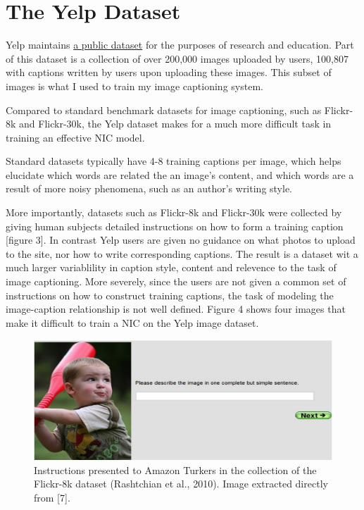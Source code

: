 \documentclass[letterpaper, 10 pt, conference]{ieeeconf}
\begin{document}
\section{The Yelp Dataset}

Yelp maintains \href{https://www.yelp.com/dataset}{a public dataset} for the purposes of research and education. Part of this dataset is a collection of over 200,000 images uploaded by users, 100,807 with captions written by users upon uploading these images. This subset of images is what I used to train my image captioning system. 

Compared to standard benchmark datasets for image captioning, such as Flickr-8k and Flickr-30k, the Yelp dataset makes for a much more difficult task in training an effective NIC model.

Standard datasets typically have 4-8 training captions per image, which helps elucidate which words are related the an image's content, and which words are a result of more noisy phenomena, such as an author's writing style. 

More importantly, datasets such as Flickr-8k and Flickr-30k were collected by giving human subjects detailed instructions on how to form a training caption [figure 3]. In contrast Yelp users are given no guidance on what photos to upload to the site, nor how to write corresponding captions. The result is a dataset wit a much larger variablility in caption style, content and relevence to the task of image captioning. More severely, since the users are not given a common set of instructions on how to construct training captions, the task of modeling the image-caption relationship is not well defined. Figure 4 shows four images that make it difficult to train a NIC on the Yelp image dataset. 

\begin{figure}[]
\centering
\includegraphics[width=1\linewidth]{boy}
\caption{Instructions presented to Amazon Turkers in the collection of the Flickr-8k dataset (Rashtchian et al., 2010). Image extracted directly from [7].}
\label{fig:test1}
\end{figure}
\end{document}
